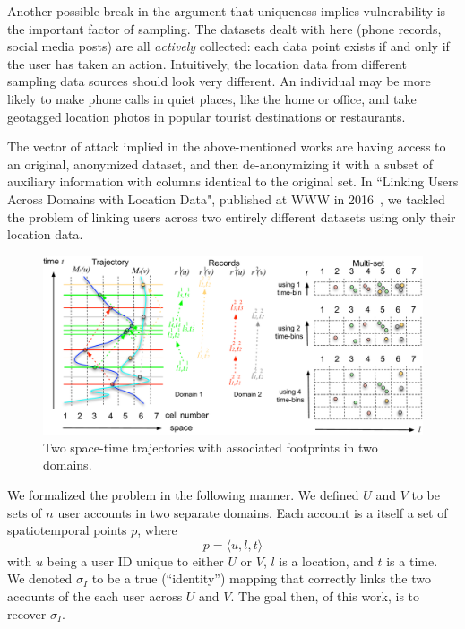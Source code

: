 
Another possible break in the argument that uniqueness implies vulnerability is the important factor of sampling.
The datasets dealt with here (phone records, social media posts) are all \emph{actively} collected: each data point exists if and only if the user has taken an action.
Intuitively, the location data from different sampling data sources should look very different.
An individual may be more likely to make phone calls in quiet places, like the home or office, and take geotagged location photos in popular tourist destinations or restaurants.


The vector of attack implied in the above-mentioned works are having access to an original, anonymized dataset, and then de-anonymizing it with a subset of auxiliary information with columns identical to the original set.
In ``Linking Users Across Domains with Location Data", published at WWW in 2016~\cite{riederer2016linking}, we tackled the problem of linking users across two entirely different datasets using only their location data.

\begin{figure}[t]
  \begin{center}
    \includegraphics[width=0.65\linewidth]{fig/linking_explain.pdf}
  \end{center}
  \caption{Two space-time trajectories with associated footprints in two domains.}
  \label{fig:linking_explain}
\end{figure}

We formalized the problem in the following manner.
We defined $U$ and $V$ to be sets of $n$ user accounts in two separate domains.
Each account is a itself a set of spatiotemporal points $p$, where
\[ p = \langle u, l, t \rangle \]
with $u$ being a user ID unique to either $U$ or $V$, $l$ is a location, and $t$ is a time.
We denoted $\sigma_I$ to be a true (``identity'') mapping that correctly links the two accounts of the each user across $U$ and $V$.
The goal then, of this work, is to recover $\sigma_I$.
    
